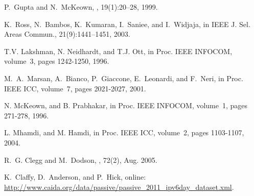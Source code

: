 \documentclass[journal,final,doublecolumn,10pt,twoside]{IEEEtranTCOM} \normalsize
\begin{document}
\begin{thebibliography}{1}
P.~Gupta and N.~McKeown,
, 19(1):20--28, 1999.

K.~Ross, N.~Bambos, K.~Kumaran, I.~Saniee, and I.~Widjaja,
\newblock in {IEEE J. Sel. Areas Commun.}, 21(9):1441--1451, 2003.

T.V. Lakshman, N. Neidhardt, and T.J. Ott,
\newblock in {Proc. IEEE INFOCOM}, volume~3, pages 1242-1250, 1996.

M.~A.~Marsan, A.~Bianco, P.~Giaccone, E.~Leonardi, and F.~Neri,
\newblock in {Proc. IEEE ICC}, volume~7, pages 2021-2027, 2001.

N. McKeown, and B. Prabhakar,
\newblock in {Proc. IEEE INFOCOM}, volume~1, pages 271-278, 1996.

L. Mhamdi, and M. Hamdi,
\newblock in {Proc. IEEE ICC}, volume~2, pages 1103-1107, 2004.











R.~G. Clegg and M.~Dodson,
, 72(2), Aug. 2005.

K.~Claffy, D.~Anderson, and P.~Hick,
\newblock online:
  \url{http://www.caida.org/data/passive/passive_2011_ipv6day_dataset.xml}.







\end{thebibliography}
\end{document}

